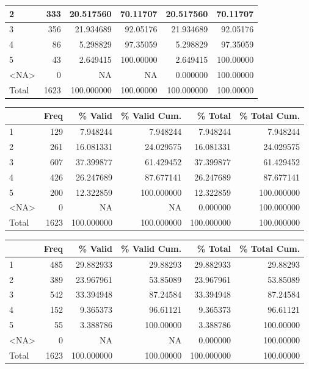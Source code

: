 \documentclass[
  letterpaper,
  DIV=11,
  numbers=noendperiod]{scrartcl}
\begin{document}
\begin{table}
\begin{tabular}[t]{l|r|r|r|r|r}
\hline
2 & 333 & 20.517560 & 70.11707 & 20.517560 & 70.11707\\
\hline
3 & 356 & 21.934689 & 92.05176 & 21.934689 & 92.05176\\
\hline
4 & 86 & 5.298829 & 97.35059 & 5.298829 & 97.35059\\
\hline
5 & 43 & 2.649415 & 100.00000 & 2.649415 & 100.00000\\
\hline
<NA> & 0 & NA & NA & 0.000000 & 100.00000\\
\hline
Total & 1623 & 100.000000 & 100.00000 & 100.000000 & 100.00000\\
\hline
\end{tabular}
\centering
\begin{tabular}[t]{l|r|r|r|r|r}
\hline
  & Freq & \% Valid & \% Valid Cum. & \% Total & \% Total Cum.\\
\hline
1 & 129 & 7.948244 & 7.948244 & 7.948244 & 7.948244\\
\hline
2 & 261 & 16.081331 & 24.029575 & 16.081331 & 24.029575\\
\hline
3 & 607 & 37.399877 & 61.429452 & 37.399877 & 61.429452\\
\hline
4 & 426 & 26.247689 & 87.677141 & 26.247689 & 87.677141\\
\hline
5 & 200 & 12.322859 & 100.000000 & 12.322859 & 100.000000\\
\hline
<NA> & 0 & NA & NA & 0.000000 & 100.000000\\
\hline
Total & 1623 & 100.000000 & 100.000000 & 100.000000 & 100.000000\\
\hline
\end{tabular}
\centering
\begin{tabular}[t]{l|r|r|r|r|r}
\hline
  & Freq & \% Valid & \% Valid Cum. & \% Total & \% Total Cum.\\
\hline
1 & 485 & 29.882933 & 29.88293 & 29.882933 & 29.88293\\
\hline
2 & 389 & 23.967961 & 53.85089 & 23.967961 & 53.85089\\
\hline
3 & 542 & 33.394948 & 87.24584 & 33.394948 & 87.24584\\
\hline
4 & 152 & 9.365373 & 96.61121 & 9.365373 & 96.61121\\
\hline
5 & 55 & 3.388786 & 100.00000 & 3.388786 & 100.00000\\
\hline
<NA> & 0 & NA & NA & 0.000000 & 100.00000\\
\hline
Total & 1623 & 100.000000 & 100.00000 & 100.000000 & 100.00000\\
\hline
\end{tabular}

\end{table}
\end{document}
